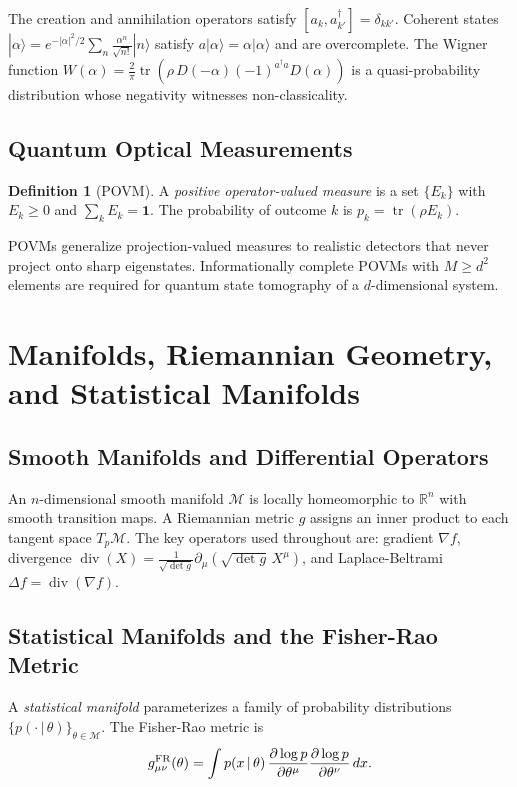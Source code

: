\documentclass[11pt, openright, twoside]{book}
\theoremstyle{plain}
\theoremstyle{definition}
\newtheorem{definition}[theorem]{Definition}
\theoremstyle{remark}
\newcommand{\given}{\,|\,}
\begin{document}
The creation and annihilation operators satisfy $[a_k,a_{k'}^\dagger]=\delta_{kk'}$.
Coherent states $|\alpha\rangle = e^{-|\alpha|^2/2}\sum_n \frac{\alpha^n}{\sqrt{n!}}|n\rangle$
satisfy $a|\alpha\rangle=\alpha|\alpha\rangle$ and are overcomplete. The Wigner function
$W(\alpha) = \frac{2}{\pi}\operatorname{tr}(\rho\,D(-\alpha)(-1)^{a^\dagger a}D(\alpha))$
is a quasi-probability distribution whose negativity witnesses non-classicality.

\section{Quantum Optical Measurements}

\begin{definition}[POVM]
A \emph{positive operator-valued measure} is a set $\{E_k\}$ with $E_k\geq 0$ and
$\sum_k E_k=\mathbf{1}$. The probability of outcome $k$ is $p_k=\operatorname{tr}(\rho E_k)$.
\end{definition}

POVMs generalize projection-valued measures to realistic detectors that never project onto
sharp eigenstates. Informationally complete POVMs with $M\geq d^2$ elements are required
for quantum state tomography of a $d$-dimensional system.

\chapter{Manifolds, Riemannian Geometry, and Statistical Manifolds}

\section{Smooth Manifolds and Differential Operators}

An $n$-dimensional smooth manifold $\mathcal{M}$ is locally homeomorphic to $\mathbb{R}^n$
with smooth transition maps. A Riemannian metric $g$ assigns an inner product to each
tangent space $T_p\mathcal{M}$. The key operators used throughout are: gradient $\nabla f$,
divergence $\operatorname{div}(X) = \frac{1}{\sqrt{\det g}}\partial_\mu(\sqrt{\det g}\,X^\mu)$,
and Laplace-Beltrami $\Delta f = \operatorname{div}(\nabla f)$.

\section{Statistical Manifolds and the Fisher-Rao Metric}

A \emph{statistical manifold} parameterizes a family of probability distributions
$\{p(\cdot\given\theta)\}_{\theta\in\mathcal{M}}$. The Fisher-Rao metric is
\begin{equation}
  g^{\rm FR}_{\mu\nu}(\theta) = \int p(x\given\theta)\,
  \frac{\partial\log p}{\partial\theta^\mu}\frac{\partial\log p}{\partial\theta^\nu}\,dx.
\end{equation}
\end{document}

